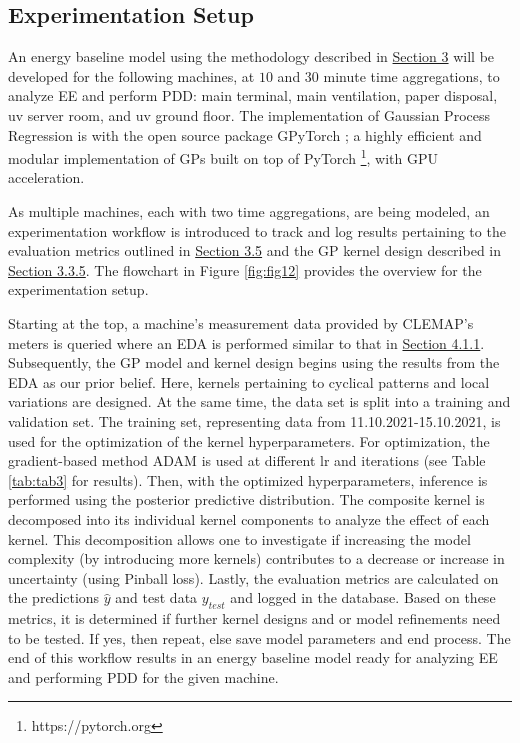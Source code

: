 \subsection{Experimentation Setup}

An energy baseline model using the methodology described in \hyperlink{section.3}{Section 3} will be developed for the following machines, at $10$ and $30$ minute time aggregations, to analyze EE and perform PDD: main terminal, main ventilation, paper disposal, uv server room, and uv ground floor. The implementation of Gaussian Process Regression is with the open source package GPyTorch \cite{gardner2018gpytorch}; a highly efficient and modular implementation of GPs built on top of PyTorch \footnote[2]{https://pytorch.org}, with \ac{GPU} acceleration. 

As multiple machines, each with two time aggregations, are being modeled, an experimentation workflow is introduced to track and log results pertaining to the evaluation metrics outlined in \hyperlink{subsection.3.5}{Section 3.5} and the GP kernel design described in \hyperlink{subsubsection.3.3.5}{Section 3.3.5}. The flowchart in Figure \ref{fig:fig12} provides the overview for the experimentation setup. 

Starting at the top, a machine's measurement data provided by CLEMAP's meters is queried where an EDA is performed similar to that in \hyperlink{subsubsection.4.1.1}{Section 4.1.1}. Subsequently, the GP model and kernel design begins using the results from the EDA as our prior belief. Here, kernels pertaining to cyclical patterns and local variations are designed. At the same time, the data set is split into a training and validation set. The training set, representing data from 11.10.2021-15.10.2021, is used for the optimization of the kernel hyperparameters. For optimization, the gradient-based method \ac{ADAM} \cite{pml1Book} is used at different \ac{lr} and iterations (see Table \ref{tab:tab3} for results). Then, with the optimized hyperparameters, inference is performed using the posterior predictive distribution. The composite kernel is decomposed into its individual kernel components to analyze the effect of each kernel. This decomposition allows one to investigate if increasing the model complexity (by introducing more kernels) contributes to a decrease or increase in uncertainty (using Pinball loss). Lastly, the evaluation metrics are calculated on the predictions $\hat{y}$ and test data $y_{test}$ and logged in the database. Based on these metrics, it is determined if further kernel designs and or model refinements need to be tested. If yes, then repeat, else save model parameters and end process. The end of this workflow results in an energy baseline model ready for analyzing EE and performing PDD for the given machine.   

